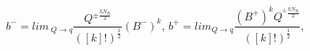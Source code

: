 \begin{equation}
b^{-}=lim\, _{Q\rightarrow q}\frac{Q^{\pm
\frac{kN_B}2}}{([k]!)^{\frac
12}}(B^{-})^k,\, b^{+}=lim_{Q\rightarrow q}\frac{(B^{+})^kQ^{^{\pm }%
\frac{kN_B}2}}{([k]!)^{\frac 12}},
\end{equation}

